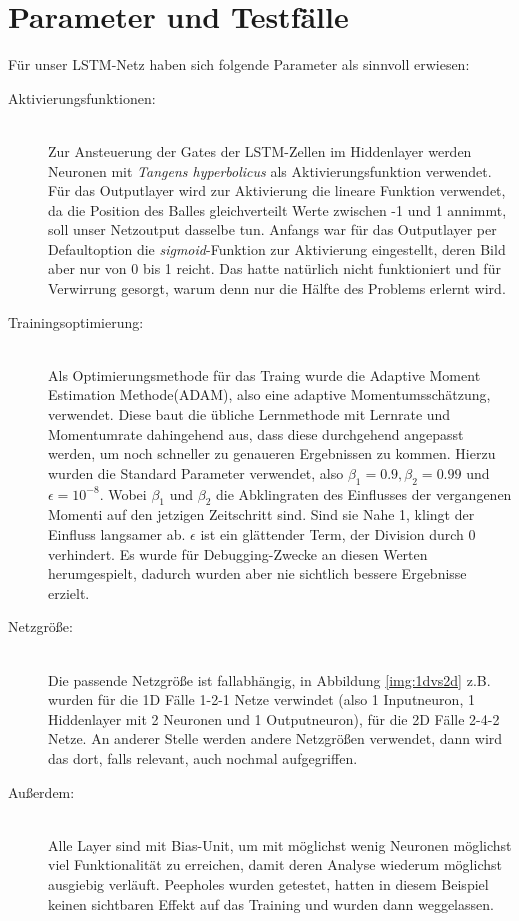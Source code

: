 \section{Parameter und Testfälle}
Für unser LSTM-Netz haben sich folgende Parameter als sinnvoll erwiesen:
\begin{description}	\item[Aktivierungsfunktionen:]\hfill \\ 
	Zur Ansteuerung der Gates der LSTM-Zellen im Hiddenlayer werden Neuronen mit \textit{Tangens hyperbolicus} als Aktivierungsfunktion verwendet. Für das Outputlayer wird zur Aktivierung die lineare Funktion verwendet, da die Position des Balles gleichverteilt Werte zwischen -1 und 1 annimmt, soll unser Netzoutput dasselbe tun. Anfangs war für das Outputlayer per Defaultoption die \textit{sigmoid}-Funktion zur Aktivierung eingestellt, deren Bild aber nur von 0 bis 1 reicht. Das hatte natürlich nicht funktioniert und für Verwirrung gesorgt, warum denn nur die Hälfte des Problems erlernt wird.  
	\item[Trainingsoptimierung:]\hfill \\ 
	Als Optimierungsmethode für das Traing wurde die Adaptive Moment Estimation Methode(ADAM), also eine adaptive Momentumsschätzung, verwendet. Diese baut die übliche Lernmethode mit Lernrate und Momentumrate dahingehend aus, dass diese durchgehend angepasst werden, um noch schneller zu genaueren Ergebnissen zu kommen. Hierzu wurden die Standard Parameter verwendet, also $ \beta_{1}=0.9, \beta_{2}=0.99 $ und $ \epsilon = 10^{-8}$. Wobei $ \beta_{1} $ und $ \beta_{2} $ die Abklingraten des Einflusses der vergangenen Momenti auf den jetzigen Zeitschritt sind. Sind sie Nahe 1, klingt der Einfluss langsamer ab. $ \epsilon$ ist ein glättender Term, der Division durch 0 verhindert. \cite{bib:adam} Es wurde für Debugging-Zwecke an diesen Werten herumgespielt, dadurch wurden aber nie sichtlich bessere Ergebnisse erzielt.
	\item[Netzgröße:]\hfill \\ 
	Die passende Netzgröße ist fallabhängig, in Abbildung \ref{img:1dvs2d} z.B. wurden für die 1D Fälle 1-2-1 Netze verwindet (also 1 Inputneuron, 1 Hiddenlayer mit 2 Neuronen und 1 Outputneuron), für die 2D Fälle 2-4-2 Netze. An anderer Stelle werden andere Netzgrößen verwendet, dann wird das dort, falls relevant, auch nochmal aufgegriffen.
	\item[Außerdem:]\hfill \\
	Alle Layer sind mit Bias-Unit, um mit möglichst wenig Neuronen möglichst viel Funktionalität zu erreichen, damit deren Analyse wiederum möglichst ausgiebig verläuft. Peepholes \cite{bib:lstm2} wurden getestet, hatten in diesem Beispiel keinen sichtbaren Effekt auf das Training und wurden dann weggelassen.  
\end{description}
